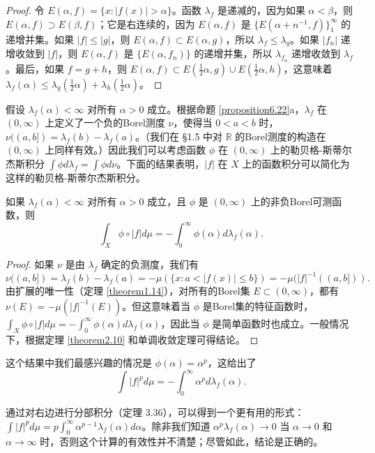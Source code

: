\documentclass[lang=cn,10pt,thmcnt=section]{elegantbook}
\begin{document}
\begin{proof}
令 $E(\alpha, f) = \{x : |f(x)| > \alpha\}$。函数 $\lambda_f$ 是递减的，因为如果 $\alpha < \beta$，则 $E(\alpha, f) \supset E(\beta, f)$；它是右连续的，因为 $E(\alpha, f)$ 是 $\{E(\alpha + n^{-1}, f)\}_{1}^{\infty}$ 的递增并集。如果 $|f| \leq |g|$，则 $E(\alpha, f) \subset E(\alpha, g)$，所以 $\lambda_f \leq \lambda_g$。如果 $|f_n|$ 递增收敛到 $|f|$，则 $E(\alpha, f)$ 是 $\{E(\alpha, f_n)\}$ 的递增并集，所以 $\lambda_{f_n}$ 递增收敛到 $\lambda_f$。最后，如果 $f = g + h$，则 $E(\alpha, f) \subset E(\frac{1}{2}\alpha, g) \cup E(\frac{1}{2}\alpha, h)$，这意味着 $\lambda_f(\alpha) \leq \lambda_g(\frac{1}{2}\alpha) + \lambda_h(\frac{1}{2}\alpha)$。
\end{proof}

假设 $\lambda_f(\alpha) < \infty$ 对所有 $\alpha > 0$ 成立。根据命题 \ref{proposition6.22}a，$\lambda_f$ 在 $(0, \infty)$ 上定义了一个负的Borel测度 $\nu$，使得当 $0 < a < b$ 时，$\nu((a, b]) = \lambda_f(b) - \lambda_f(a)$。（我们在 §1.5 中对 $\mathbb{R}$ 的Borel测度的构造在 $(0, \infty)$ 上同样有效。）因此我们可以考虑函数 $\phi$ 在 $(0, \infty)$ 上的勒贝格-斯蒂尔杰斯积分 $\int \phi d\lambda_f = \int \phi d\nu$。下面的结果表明，$|f|$ 在 $X$ 上的函数积分可以简化为这样的勒贝格-斯蒂尔杰斯积分。

\begin{proposition}\label{proposition6.23}
如果 $\lambda_f(\alpha) < \infty$ 对所有 $\alpha > 0$ 成立，且 $\phi$ 是 $(0, \infty)$ 上的非负Borel可测函数，则
\[ \int_X \phi \circ |f| d\mu = -\int_0^{\infty} \phi(\alpha)d\lambda_f(\alpha). \]
\end{proposition}

\begin{proof}
如果 $\nu$ 是由 $\lambda_f$ 确定的负测度，我们有
\[ \nu((a, b]) = \lambda_f(b) - \lambda_f(a) = -\mu(\{x : a < |f(x)| \leq b\}) = -\mu(|f|^{-1}((a, b])). \]
由扩展的唯一性（定理 \ref{theorem1.14}），对所有的Borel集 $E \subset (0, \infty)$，都有 $\nu(E) = -\mu(|f|^{-1}(E))$。但这意味着当 $\phi$ 是Borel集的特征函数时，$\int_X \phi \circ |f| d\mu = -\int_0^{\infty} \phi(\alpha)d\lambda_f(\alpha)$，因此当 $\phi$ 是简单函数时也成立。一般情况下，根据定理 \ref{theorem2.10} 和单调收敛定理可得结论。
\end{proof}

这个结果中我们最感兴趣的情况是 $\phi(\alpha) = \alpha^p$，这给出了
\[ \int |f|^p d\mu = -\int_0^{\infty} \alpha^p d\lambda_f(\alpha). \]

通过对右边进行分部积分（定理 3.36），可以得到一个更有用的形式：$\int |f|^p d\mu = p\int_0^{\infty} \alpha^{p-1}\lambda_f(\alpha) d\alpha$。除非我们知道 $\alpha^p\lambda_f(\alpha) \to 0$ 当 $\alpha \to 0$ 和 $\alpha \to \infty$ 时，否则这个计算的有效性并不清楚；尽管如此，结论是正确的。
\end{document}
